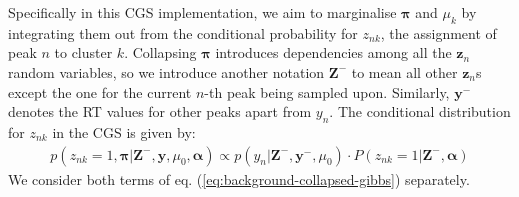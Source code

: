 Specifically in this CGS implementation, we aim to marginalise $\boldsymbol{\pi}$ and $\mu_k$ by integrating them out from the conditional probability for $z_{nk}$, the assignment of peak $n$ to cluster $k$. Collapsing $\boldsymbol{\pi}$ introduces dependencies among all the $\boldsymbol{z}_n$ random variables, so we introduce another notation $\boldsymbol{Z}^{-}$ to mean all other $\boldsymbol{z}_n$s except the one for the current $n$-th peak being sampled upon. Similarly, $\boldsymbol{y}^{-}$ denotes the RT values for other peaks apart from $y_n$. The conditional distribution for $z_{nk}$ in the CGS is given by:
\begin{equation}
\begin{aligned}
p(z_{nk}=1, \boldsymbol{\pi} \vert \boldsymbol{Z}^{-}, \boldsymbol{y}, \mu_0, \boldsymbol{\alpha}) \propto p(y_n \vert \boldsymbol{Z}^{-},  \boldsymbol{y}^{-}, \mu_0) \cdot P(z_{nk}=1 \vert \boldsymbol{Z}^{-}, \boldsymbol{\alpha})
\end{aligned}
\label{eq:background-collapsed-gibbs}
\end{equation}
We consider both terms of eq. (\ref{eq:background-collapsed-gibbs}) separately. 
